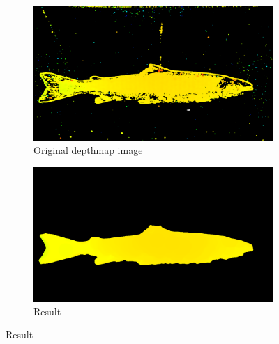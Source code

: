 \begin{figure}[H]
    \centering
    \begin{subfigure}{0.49\textwidth}
        \includegraphics[width=\linewidth]{images/results/algorithm_test/original_63}
        \caption{Original depthmap image} 
        \label{fig:original_depthmap_63}
    \end{subfigure}\hspace*{\fill}
    \begin{subfigure}{0.49\textwidth}
        \includegraphics[width=\linewidth]{images/results/algorithm_test/median_filter_63}
        \caption{Result} 
        \label{fig:result_63}
    \end{subfigure}
    

\end{figure}
